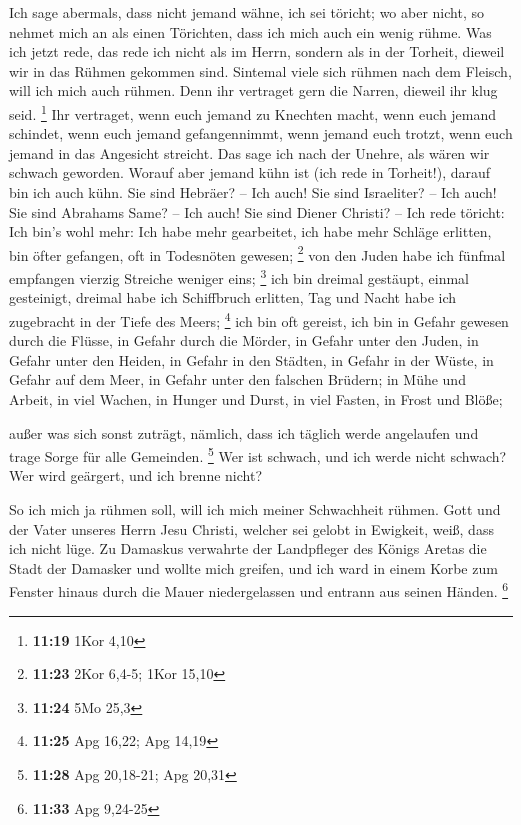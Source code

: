  Ich sage abermals, dass nicht jemand wähne, ich sei
töricht; wo aber nicht, so nehmet mich an als einen Törichten, dass ich
mich auch ein wenig rühme.  Was ich jetzt rede, das rede
ich nicht als im Herrn, sondern als in der Torheit, dieweil wir in das
Rühmen gekommen sind.  Sintemal viele sich rühmen nach dem
Fleisch, will ich mich auch rühmen.  Denn ihr vertraget
gern die Narren, dieweil ihr klug seid. \footnote{\textbf{11:19} 1Kor
  4,10}  Ihr vertraget, wenn euch jemand zu Knechten macht,
wenn euch jemand schindet, wenn euch jemand gefangennimmt, wenn jemand
euch trotzt, wenn euch jemand in das Angesicht streicht. 
Das sage ich nach der Unehre, als wären wir schwach geworden. Worauf
aber jemand kühn ist (ich rede in Torheit!), darauf bin ich auch kühn.
 Sie sind Hebräer? -- Ich auch! Sie sind Israeliter? -- Ich
auch! Sie sind Abrahams Same? -- Ich auch!  Sie sind Diener
Christi? -- Ich rede töricht: Ich bin's wohl mehr: Ich habe mehr
gearbeitet, ich habe mehr Schläge erlitten, bin öfter gefangen, oft in
Todesnöten gewesen; \footnote{\textbf{11:23} 2Kor 6,4-5; 1Kor 15,10}
 von den Juden habe ich fünfmal empfangen vierzig Streiche
weniger eins; \footnote{\textbf{11:24} 5Mo 25,3}  ich bin
dreimal gestäupt, einmal gesteinigt, dreimal habe ich Schiffbruch
erlitten, Tag und Nacht habe ich zugebracht in der Tiefe des Meers;
\footnote{\textbf{11:25} Apg 16,22; Apg 14,19}  ich bin oft
gereist, ich bin in Gefahr gewesen durch die Flüsse, in Gefahr durch die
Mörder, in Gefahr unter den Juden, in Gefahr unter den Heiden, in Gefahr
in den Städten, in Gefahr in der Wüste, in Gefahr auf dem Meer, in
Gefahr unter den falschen Brüdern;  in Mühe und Arbeit, in
viel Wachen, in Hunger und Durst, in viel Fasten, in Frost und Blöße;

 außer was sich sonst zuträgt, nämlich, dass ich täglich
werde angelaufen und trage Sorge für alle Gemeinden. \footnote{\textbf{11:28}
  Apg 20,18-21; Apg 20,31}  Wer ist schwach, und ich werde
nicht schwach? Wer wird geärgert, und ich brenne nicht?

 So ich mich ja rühmen soll, will ich mich meiner
Schwachheit rühmen.  Gott und der Vater unseres Herrn Jesu
Christi, welcher sei gelobt in Ewigkeit, weiß, dass ich nicht lüge.
 Zu Damaskus verwahrte der Landpfleger des Königs Aretas
die Stadt der Damasker und wollte mich greifen,  und ich
ward in einem Korbe zum Fenster hinaus durch die Mauer niedergelassen
und entrann aus seinen Händen. \footnote{\textbf{11:33} Apg 9,24-25}

